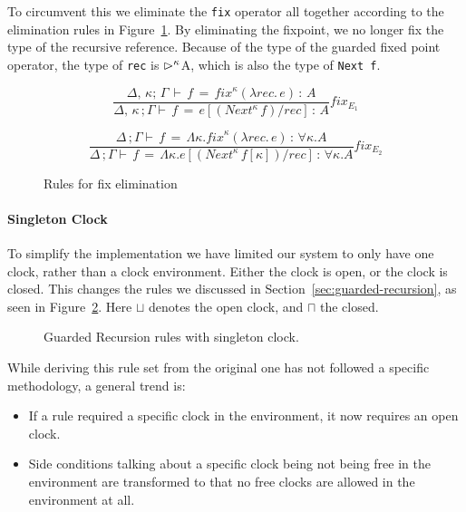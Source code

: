 To circumvent this we eliminate the \texttt{fix} operator all together according
to the elimination rules in Figure~\ref{fig:fix_elim_rules}. By eliminating the
fixpoint, we no longer fix the type of the recursive reference. Because of the
type of the guarded fixed point operator, the type of \texttt{rec} is
$\rhd^{\kappa}$A, which is also the type of \texttt{Next f}.

\begin{figure}[h]
  \[
\frac { \Delta ,\, \kappa ; \, \Gamma \, \vdash \, f\, =\, { fix }^{ \kappa  }(\lambda
  rec.\, e)\, :\, A }{ \Delta ,\, \kappa \, ; \Gamma \vdash \, f\, =\, e[{ (Next^{ \kappa
    }\, f) }/{ rec }]\, :\, A } fix_{E_1}
\]

\[
\frac { \Delta \, ; \Gamma \vdash \, f\, =\, \Lambda \kappa .{ fix }^{ \kappa  }(\lambda
  rec.\, e)\, :\, \forall \kappa .A }{ \Delta \, ; \Gamma \vdash \, f\, =\, \Lambda
  \kappa .e[{ (Next^{ \kappa  }\, f[\kappa ]) }/{ rec }]\, :\, \forall \kappa .A
} fix_{E_2}
\]
  \caption{Rules for fix elimination}
  \label{fig:fix_elim_rules}
\end{figure}

\paragraph{Singleton Clock}
To simplify the implementation we have limited our system to only have one
clock, rather than a clock environment. Either the clock is open, or the clock
is closed. This changes the rules we discussed in
Section~\ref{sec:guarded-recursion}, as seen in
Figure~\ref{fig:gr_rules_sin_clock}. Here
$\sqcup$ denotes the open clock, and $\sqcap$ the closed. 

\begin{figure}[h]
  
  \caption{Guarded Recursion rules with singleton clock.}
  \label{fig:gr_rules_sin_clock}
\end{figure}

While deriving this rule set from the original one has not followed a specific
methodology, a general trend is:

\begin{itemize}
\item If a rule required a specific clock in the environment, it now requires an
  open clock.
\item Side conditions talking about a specific clock being not being free in the
  environment are transformed to that no free clocks are allowed in the
  environment at all.
\end{itemize}

